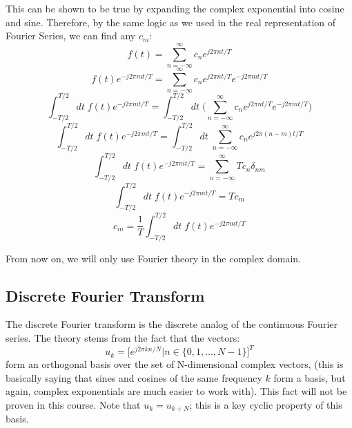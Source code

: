 \documentclass[a4paper]{article}
\numberwithin{equation}{section}
\begin{document}
This can be shown to be true by expanding the complex exponential into cosine and sine. Therefore, by the same logic as we used in the real representation of Fourier Series, we can find any $c_m$:
\begin{equation}
f(t)=\sum_{n=-\infty}^{\infty}c_n e^{j2\pi nt/T}
\end{equation}
\begin{equation}
f(t)e^{-j2\pi mt/T}=\sum_{n=-\infty}^{\infty}c_n e^{j2\pi nt/T}e^{-j2\pi mt/T}
\end{equation}
\begin{equation}
\int_{-T/2}^{T/2}dt\; f(t)e^{-j2\pi mt/T}=\int_{-T/2}^{T/2}dt\; \big(\sum_{n=-\infty}^{\infty}c_n e^{j2\pi nt/T}e^{-j2\pi mt/T}\big)
\end{equation}
\begin{equation}
\int_{-T/2}^{T/2}dt\; f(t)e^{-j2\pi mt/T}=\int_{-T/2}^{T/2}dt\; \sum_{n=-\infty}^{\infty}c_n e^{j2\pi (n-m)t/T}
\end{equation}
\begin{equation}
\int_{-T/2}^{T/2}dt\; f(t)e^{-j2\pi mt/T}=\sum_{n=-\infty}^{\infty}Tc_n\delta_{nm}
\end{equation}
\begin{equation}
\int_{-T/2}^{T/2}dt\; f(t)e^{-j2\pi mt/T}=Tc_m
\end{equation}
\begin{equation}
\boxed{
c_m=\frac{1}{T}\int_{-T/2}^{T/2}dt\; f(t)e^{-j2\pi mt/T}}
\end{equation}

From now on, we will only use Fourier theory in the complex domain.

\subsection{Discrete Fourier Transform}
The discrete Fourier transform is the discrete analog of the continuous Fourier series. The theory stems from the fact that the vectors:
\begin{equation}
u_k = \Big[ e^{j2\pi kn/N}|n \in \{ 0,1,...,N-1\} \Big]^T
\end{equation}
form an orthogonal basis over the set of N-dimensional complex vectors, (this is basically saying that sines and cosines of the same frequency $k$ form a basis, but again, complex exponentials are much easier to work with). This fact will not be proven in this course. Note that $u_k = u_{k+N}$; this  is a key cyclic property of this basis.\\
\end{document}

